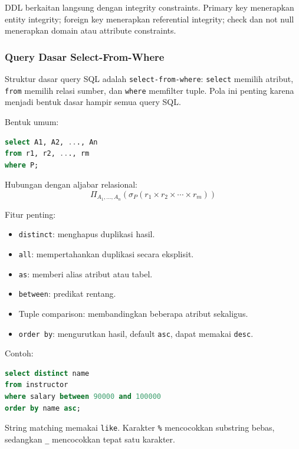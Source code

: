 DDL berkaitan langsung dengan integrity constraints. Primary key menerapkan entity integrity; foreign key menerapkan referential integrity; check dan not null menerapkan domain atau attribute constraints.

\subsubsection{Query Dasar Select-From-Where}

\begin{jawab}
Struktur dasar query SQL adalah \texttt{select-from-where}: \texttt{select} memilih atribut, \texttt{from} memilih relasi sumber, dan \texttt{where} memfilter tuple. Pola ini penting karena menjadi bentuk dasar hampir semua query SQL.
\end{jawab}

Bentuk umum:
\begin{lstlisting}[language=SQL, caption={Struktur dasar query SQL}, label={lst:sql-basic-query}]
select A1, A2, ..., An
from r1, r2, ..., rm
where P;
\end{lstlisting}

Hubungan dengan aljabar relasional:
\[
    \Pi_{A_1,\ldots,A_n}(\sigma_P(r_1 \times r_2 \times \cdots \times r_m))
\]

Fitur penting:
\begin{itemize}
    \item \texttt{distinct}: menghapus duplikasi hasil.
    \item \texttt{all}: mempertahankan duplikasi secara eksplisit.
    \item \texttt{as}: memberi alias atribut atau tabel.
    \item \texttt{between}: predikat rentang.
    \item Tuple comparison: membandingkan beberapa atribut sekaligus.
    \item \texttt{order by}: mengurutkan hasil, default \texttt{asc}, dapat memakai \texttt{desc}.
\end{itemize}

Contoh:
\begin{lstlisting}[language=SQL, caption={Contoh query dasar}, label={lst:sql-basic-example}]
select distinct name
from instructor
where salary between 90000 and 100000
order by name asc;
\end{lstlisting}

String matching memakai \texttt{like}. Karakter \texttt{\%} mencocokkan substring bebas, sedangkan \texttt{\_} mencocokkan tepat satu karakter.

